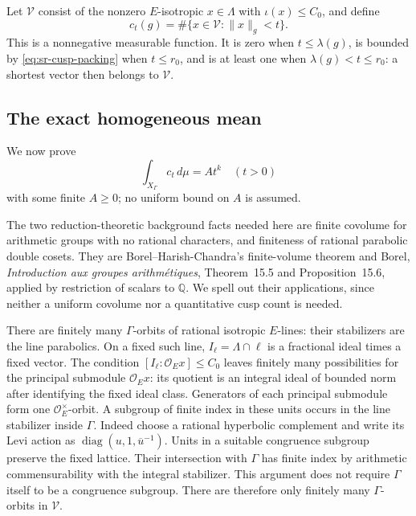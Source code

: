 Let \(\mathcal V\) consist of the nonzero \(E\)-isotropic
\(x\in\Lambda\) with \(\iota(x)\le C_0\), and define
\[
                    c_t(g)=
                  \#\{x\in\mathcal V:\|x\|_g<t\}.
\]
This is a nonnegative measurable function.
It is zero when \(t\le\lambda(g)\), is bounded by
\eqref{eq:sr-cusp-packing} when \(t\le r_0\), and is at least
one when \(\lambda(g)<t\le r_0\): a shortest vector then
belongs to \(\mathcal V\).

\subsection{The exact homogeneous mean}

We now prove
\begin{equation}\label{eq:sr-cusp-count-homogeneous}
                 \int_{X_\Gamma}c_t\,d\mu=A t^k
                       \quad(t>0)
\end{equation}
with some finite \(A\ge0\); no uniform bound on \(A\) is assumed.

The two reduction-theoretic background facts needed here are
finite covolume for arithmetic groups with no rational
characters, and finiteness of rational parabolic double cosets.
They are Borel--Harish-Chandra's finite-volume theorem and
Borel, \emph{Introduction aux groupes arithm\'etiques},
Theorem~15.5 and Proposition~15.6, applied by restriction of
scalars to \(\mathbb Q\).
We spell out their applications, since neither a uniform
covolume nor a quantitative cusp count is needed.

There are finitely many \(\Gamma\)-orbits of rational isotropic
\(E\)-lines: their stabilizers are the line parabolics.
On a fixed such line, \(I_\ell=\Lambda\cap\ell\) is a
fractional ideal times a fixed vector.
The condition \([I_\ell:\mathcal O_Ex]\le C_0\) leaves finitely
many possibilities for the principal submodule
\(\mathcal O_Ex\): its quotient is an integral ideal of bounded
norm after identifying the fixed ideal class.
Generators of each principal submodule form one
\(\mathcal O_E^\times\)-orbit.
A subgroup of finite index in these units occurs in the line
stabilizer inside \(\Gamma\).
Indeed choose a rational hyperbolic complement and write its
Levi action as
\(\operatorname{diag}(u,1,\overline u^{-1})\).
Units in a suitable congruence subgroup preserve the fixed
lattice.  Their intersection with \(\Gamma\) has finite index
by arithmetic commensurability with the integral stabilizer.
This argument does not require \(\Gamma\) itself to be a
congruence subgroup.
There are therefore only finitely many
\(\Gamma\)-orbits in \(\mathcal V\).

